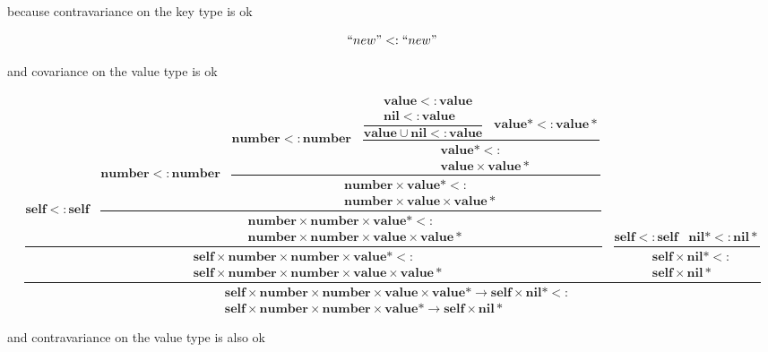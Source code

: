 \documentclass[12pt]{article}
\newcommand{\Top}{\mathbf{value}}
\newcommand{\Nil}{\mathbf{nil}}
\newcommand{\Self}{\mathbf{self}}
\newcommand{\Number}{\mathbf{number}}
\newcommand{\TopStar}{\Top{*}}
\newcommand{\NilStar}{\Nil{*}}
\newcommand{\subtype}{<:}
\begin{document}
because contravariance on the key type is ok

\[
``new" \subtype ``new"
\]

and covariance on the value type is ok

\begin{scriptsize}
\[
\dfrac
{
\dfrac
{
\Self \subtype \Self \;\;\;
\dfrac
{
\Number \subtype \Number \;\;\;
\dfrac
{
\Number \subtype \Number \;\;\;
\dfrac
{
\dfrac
{
\begin{aligned}
& \Top \subtype \Top \\
& \Nil \subtype \Top
\end{aligned}
}
{\Top \cup \Nil \subtype \Top} \;\;\;
\TopStar \subtype \TopStar
}
{
\begin{aligned}
& \TopStar \subtype \\
& \Top \times \TopStar
\end{aligned}
}
}
{
\begin{aligned}
& \Number \times \TopStar \subtype \\
& \Number \times \Top \times \TopStar
\end{aligned}
}
}
{
{
\begin{aligned}
& \Number \times \Number \times \TopStar \subtype \\
& \Number \times \Number \times \Top \times \TopStar
\end{aligned}
}
}
}
{
\begin{aligned}
& \Self \times \Number \times \Number \times \TopStar \subtype \\
& \Self \times \Number \times \Number \times \Top \times \TopStar
\end{aligned}
}
\;\;\;
\dfrac
{
\Self \subtype \Self \;\;\;
\NilStar \subtype \NilStar
}
{
\begin{aligned}
& \Self \times \NilStar \subtype \\
& \Self \times \NilStar
\end{aligned}
}
}
{
\begin{aligned}
& \Self \times \Number \times \Number \times \Top \times \TopStar \rightarrow \Self \times \NilStar \subtype \\
& \Self \times \Number \times \Number \times \TopStar \rightarrow \Self \times \NilStar
\end{aligned}
}
\]
\end{scriptsize}

and contravariance on the value type is also ok
\end{document}

